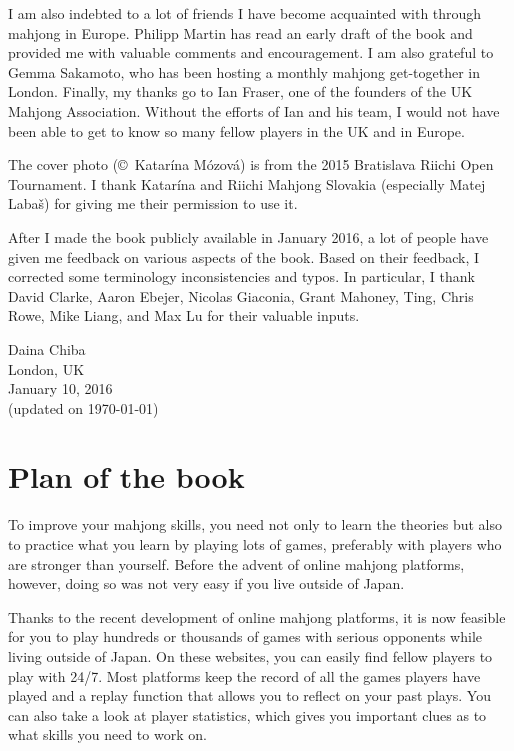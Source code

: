 \bigskip
I am also indebted to a lot of friends I have become acquainted with through mahjong in Europe. Philipp Martin has read an early draft of the book and provided me with valuable comments and encouragement. I am also grateful to Gemma Sakamoto, who has been hosting a monthly mahjong get-together in London. 
Finally, my thanks go to Ian Fraser, one of the founders of the UK Mahjong Association. 
Without the efforts of Ian and his team, I would not have been able to get to know so many fellow players in the UK and in Europe.

\bigskip
The cover photo (\copyright~Katar\'{i}na M\'{o}zov\'{a}) is from the 2015 Bratislava Riichi Open Tournament. I thank Katar\'{i}na and Riichi Mahjong Slovakia (especially Matej Laba\v{s}) for giving me their permission to use it.

\bigskip
After I made the book publicly available in January 2016, a lot of people have given me feedback on various aspects of the book. Based on their feedback, I corrected some terminology inconsistencies and typos. In particular, I thank David Clarke, Aaron Ebejer, Nicolas Giaconia, Grant Mahoney, Ting, Chris Rowe, Mike Liang, and Max Lu for their valuable inputs.

\vfill

\hfill Daina Chiba\\
\hfill London, UK\\
\hfill January 10, 2016\\
\hfill (updated on \today)

\section*{Plan of the book}

To improve your mahjong skills, you need not only to learn the theories but also to practice what you learn by playing lots of games, preferably with players who are stronger than yourself. Before the advent of online mahjong platforms, however, doing so was not very easy if you live outside of Japan. 

\bigskip
Thanks to the recent development of online mahjong platforms, it is now feasible for you to play hundreds or thousands of games with serious opponents while living outside of Japan. On these websites, you can easily find fellow players to play with 24/7. Most platforms keep the record of all the games players have played and a replay function that allows you to reflect on your past plays. You can also take a look at player statistics, which gives you important clues as to what skills you need to work on.  

